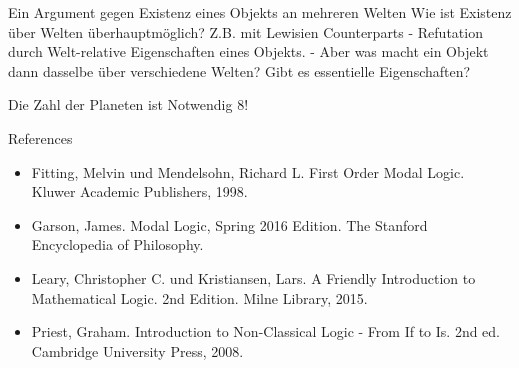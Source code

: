 \documentclass[12pt]{beamer}
\begin{document}
\begin{frame}{Ein Argument gegen Existenz eines Objekts an mehreren Welten}
  Wie ist Existenz über Welten überhauptmöglich?  Z.B. mit Lewisien
  Counterparts - Refutation durch Welt-relative Eigenschaften eines
  Objekts.  - Aber was macht ein Objekt dann dasselbe über
  verschiedene Welten? Gibt es essentielle Eigenschaften?
\end{frame}

\begin{frame}{Die Zahl der Planeten ist Notwendig 8!}
  
\end{frame}

\begin{frame}{References}
  
  \begin{itemize}
  \item Fitting, Melvin und Mendelsohn, Richard L. First Order Modal
    Logic. Kluwer Academic Publishers, 1998.
  \item Garson, James. Modal Logic, Spring 2016 Edition. The Stanford
    Encyclopedia of Philosophy.
  \item Leary, Christopher C. und Kristiansen, Lars. A Friendly
    Introduction to Mathematical Logic. 2nd Edition. Milne Library,
    2015.
  \item Priest, Graham. Introduction to Non-Classical Logic - From If
    to Is. 2nd ed. Cambridge University Press, 2008.

  \end{itemize}

\end{frame}
\end{document}
